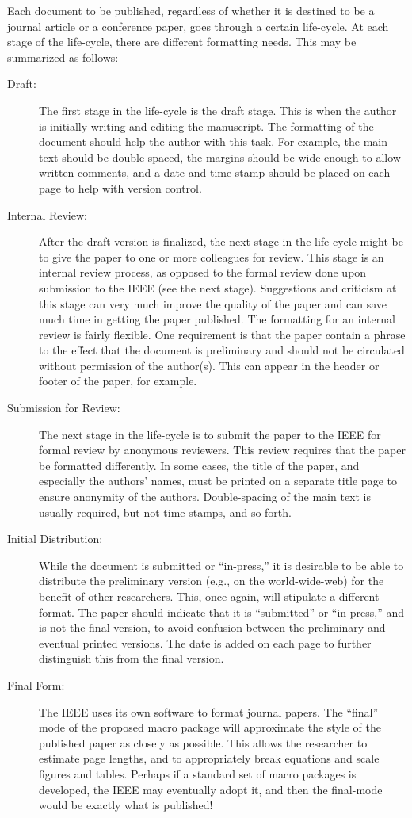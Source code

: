 \documentclass[%
	final,
	reprint,
	notitlepage,
	narroweqnarray,
	inline,
	twoside,
        invited,
	]{ieee}
\begin{document}
Each document to be published, regardless of whether it is destined to
be a journal article or a conference paper, goes through a certain
life-cycle. At each stage of the life-cycle, there are different
formatting needs. This may be summarized as follows:
\begin{description}
\item[Draft:] The first stage in the life-cycle is the draft stage.
    This is when the author is initially writing and editing the 
    manuscript. The formatting of the document should help the author 
    with this task. For example, the main text should be
    double-spaced, the margins should be wide enough to allow written
    comments, and a date-and-time stamp should be placed on each page to 
    help with version control.
\item[Internal Review:] After the draft version is finalized,
    the next stage in the life-cycle might be to give the paper
    to one or more colleagues for review. This stage is an internal review
    process, as opposed to the formal review done upon submission
    to the IEEE (see the next stage). Suggestions and 
    criticism at this stage can very much improve the quality of the 
    paper and can save much time in getting the paper 
    published. The formatting for an internal review is fairly flexible. 
    One requirement is that the paper contain a phrase to the effect that
    the document is preliminary and should not be circulated without
    permission of the author(s).  This can appear in the header or footer of
    the paper, for example.
\item[Submission for Review:] The next stage in the life-cycle is to 
    submit the paper to the IEEE for formal review by anonymous reviewers. 
    This review requires that the paper be formatted differently. In some 
    cases, the title of the paper, and especially the authors' names, 
    must be printed on a separate title page to ensure anonymity of the
    authors. Double-spacing of the main text is usually required, but not 
    time stamps, and so forth.
\item[Initial Distribution:] While the document is submitted or 
    ``in-press,'' it is desirable to be able to distribute the 
    preliminary version (e.g., on the world-wide-web) for the 
    benefit of other researchers. This, once again, will stipulate a 
    different format. The paper should indicate that it is
    ``submitted'' or ``in-press,'' and is not the final version, to 
    avoid confusion between the preliminary and eventual printed
    versions. The date is added on each page to further distinguish this
    from the final version.
\item[Final Form:] The IEEE uses its own software to format journal
    papers. The ``final'' mode of the proposed macro package will
    approximate the style of the published paper as closely as possible.
    This allows the researcher to estimate page lengths, and to 
    appropriately break equations and scale figures and tables. Perhaps 
    if a standard set of macro packages is developed, the IEEE may 
    eventually adopt it, and then the final-mode would be exactly 
    what is published!


\end{description}
\end{document}
